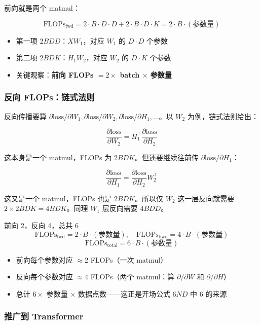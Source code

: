 \documentclass[a4paper]{article}
\begin{document}
前向就是两个 matmul：

\[
\text{FLOPs}_{\text{fwd}} = 2 \cdot B \cdot D \cdot D + 2 \cdot B \cdot D \cdot K = 2 \cdot B \cdot (\text{参数量})
\]

\begin{itemize}
\item 第一项 $2BDD$：$X W_1$，对应 $W_1$ 的 $D \cdot D$ 个参数
\item 第二项 $2BDK$：$H_1 W_2$，对应 $W_2$ 的 $D \cdot K$ 个参数
\item 关键观察：\textbf{前向 FLOPs $= 2 \times$ batch $\times$ 参数量}
\end{itemize}

\subsubsection{反向 FLOPs：链式法则}

反向传播要算 $\partial \text{loss} / \partial W_1, \partial \text{loss} / \partial W_2, \partial \text{loss} / \partial H_1, \dots$。以 $W_2$ 为例，链式法则给出：

\[
\frac{\partial \text{loss}}{\partial W_2} = H_1^\top \frac{\partial \text{loss}}{\partial H_2}
\]

这本身是一个 matmul，FLOPs 为 $2 B D K$。但还要继续往前传 $\partial \text{loss} / \partial H_1$：

\[
\frac{\partial \text{loss}}{\partial H_1} = \frac{\partial \text{loss}}{\partial H_2} W_2^\top
\]

这又是一个 matmul，FLOPs 也是 $2 B D K$。所以仅 $W_2$ 这一层反向就需要 $2 \times 2BDK = 4BDK$。同理 $W_1$ 层反向需要 $4BDD$。

\begin{importantbox}{前向 2，反向 4，总共 6}
\[
\text{FLOPs}_{\text{fwd}} = 2 \cdot B \cdot (\text{参数量}), \quad \text{FLOPs}_{\text{bwd}} = 4 \cdot B \cdot (\text{参数量})
\]
\[
\text{FLOPs}_{\text{total}} = 6 \cdot B \cdot (\text{参数量})
\]
\begin{itemize}
\item 前向每个参数对应 $\approx 2$ FLOPs（一次 matmul）
\item 反向每个参数对应 $\approx 4$ FLOPs（两个 matmul：算 $\partial/\partial W$ 和 $\partial/\partial H$）
\item 总计 $6 \times$ 参数量 $\times$ 数据点数——这正是开场公式 $6ND$ 中 6 的来源
\end{itemize}
\end{importantbox}

\subsubsection{推广到 Transformer}
\end{document}
